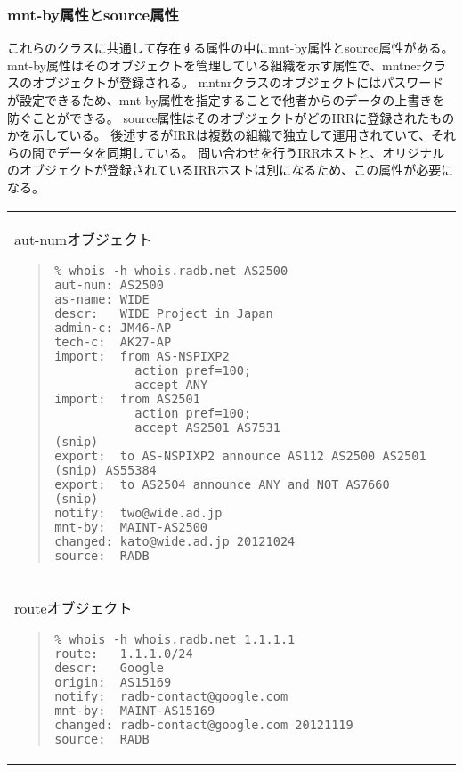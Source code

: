 \subsubsection{mnt-by属性とsource属性}
これらのクラスに共通して存在する属性の中にmnt-by属性とsource属性がある。
mnt-by属性はそのオブジェクトを管理している組織を示す属性で、mntnerクラスのオブジェクトが登録される。
mntnrクラスのオブジェクトにはパスワードが設定できるため、mnt-by属性を指定することで他者からのデータの上書きを防ぐことができる。
source属性はそのオブジェクトがどのIRRに登録されたものかを示している。
後述するがIRRは複数の組織で独立して運用されていて、それらの間でデータを同期している。
問い合わせを行うIRRホストと、オリジナルのオブジェクトが登録されているIRRホストは別になるため、この属性が必要になる。

\begin{tabular}{l}
\begin{itembox}[c]{aut-numオブジェクト}
\begin{quote}
\begin{minilinespace}
\begin{verbatim}
% whois -h whois.radb.net AS2500 
aut-num: AS2500
as-name: WIDE
descr:   WIDE Project in Japan
admin-c: JM46-AP
tech-c:  AK27-AP
import:  from AS-NSPIXP2
           action pref=100;
           accept ANY
import:  from AS2501
           action pref=100;
           accept AS2501 AS7531                     
(snip)
export:  to AS-NSPIXP2 announce AS112 AS2500 AS2501 (snip) AS55384
export:  to AS2504 announce ANY and NOT AS7660      
(snip)
notify:  two@wide.ad.jp
mnt-by:  MAINT-AS2500
changed: kato@wide.ad.jp 20121024
source:  RADB
\end{verbatim}
\end{minilinespace}
\end{quote}
\end{itembox}
\\
\begin{itembox}[c]{routeオブジェクト}
\begin{quote}
\begin{minilinespace}
\begin{verbatim}
% whois -h whois.radb.net 1.1.1.1
route:   1.1.1.0/24
descr:   Google
origin:  AS15169
notify:  radb-contact@google.com
mnt-by:  MAINT-AS15169
changed: radb-contact@google.com 20121119
source:  RADB
\end{verbatim}
\end{minilinespace}
\end{quote}
\end{itembox}
\\

\end{tabular}
